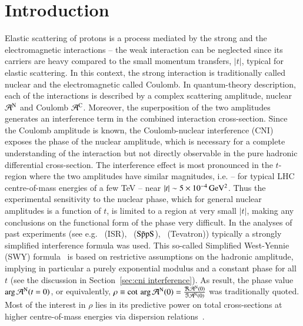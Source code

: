 \section{Introduction}
\label{sec:introduction}

Elastic scattering of protons is a process mediated by the strong and the electromagnetic interactions -- the weak interaction can be neglected since its carriers are heavy compared to the small momentum transfers, $|t|$, typical for elastic scattering. In this context, the strong interaction is traditionally called nuclear and the electromagnetic called Coulomb. In quantum-theory description, each of the interactions is described by a complex scattering amplitude, nuclear ${\cal A}^{\rm N}$ and Coulomb ${\cal A}^{\rm C}$. Moreover, the superposition 
of the two amplitudes generates an interference term in the combined interaction cross-section. 
Since the Coulomb amplitude is known, the Coulomb-nuclear interference (CNI) exposes the phase of the nuclear amplitude, which is necessary for a complete understanding of the interaction but not directly observable in the pure hadronic differential cross-section. The interference effect is most pronounced in the $t$-region where the two amplitudes have similar magnitudes, i.e. -- for typical LHC centre-of-mass energies of a few TeV -- near $|t| \sim 5 \times 10^{-4}\,\rm GeV^{2}$. Thus the experimental sensitivity to 
the nuclear phase, which for general nuclear amplitudes is a function of $t$, 
is limited to a region at very small $|t|$, making any conclusions on the 
functional form of the phase very difficult.
In the analyses of past experiments (see e.g.~\cite{plb43,plb66,npb141,prl47,plb115,plb120,plb128,npb262} 
(ISR),~\cite{plb198,plb316} ($\rm S\bar{p}pS$),~\cite{prl68} (Tevatron)) 
typically a strongly simplified interference formula was used. This so-called
Simplified West-Yennie (SWY) formula~\cite{wy68} is based on restrictive assumptions on the 
hadronic amplitude, implying in particular a purely exponential modulus and a 
constant phase for all $t$ (see the discussion in 
Section~\ref{sec:cni interference}).
As result, the phase value $\arg {\cal A}^{\rm N} (t=0)$, or
equivalently, $\rho \equiv \cot \, \arg {\cal A}^{\rm N} (0) = \frac{\Re {\cal A}^{\rm N} (0)}{\Im {\cal A}^{\rm N} (0)}$ was traditionally quoted. 
Most of the interest in $\rho$ lies in its predictive power on total cross-sections at higher centre-of-mass energies via dispersion 
relations~\cite{dremin-dispersion}. 

